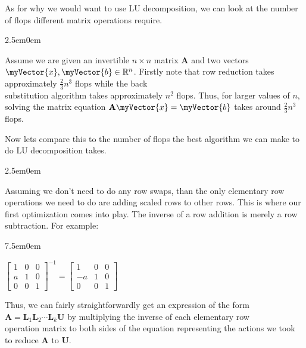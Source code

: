 \documentclass{book}
\newcommand{\hTwo}{%
   \color{MidnightBlue}%
   \fontsize{13}{15}\selectfont%
}
\newcommand{\hThree}{%
   \color{PineGreen}
   \fontsize{13}{15}\selectfont%
}
\newenvironment{myIndent}{%
   \begin{adjustwidth}{2.5em}{0em}%
}{%
   \end{adjustwidth}%
}
\newenvironment{myTindent}{%
   \begin{adjustwidth}{7.5em}{0em}%
}{%
   \end{adjustwidth}%
}
\newcommand{\retTwo}{\hfill\bigbreak}
\newcommand{\mVec}[1]{\myVector{#1}}
\newcommand{\mMat}[1]{\mathbf{#1}}
\begin{document}
   As for why we would want to use LU decomposition, we can look at the number of flops different matrix operations require.
   \hTwo
   \begin{myIndent}
      Assume we are given an invertible $n\times n$ matrix $\mMat{A}$ and two vectors $\mVec{x}, \mVec{b} \in \mathbb{R}^n$. \retTwo
      Firstly note that row reduction takes approximately $\frac{2}{3}n^3$ flops while the back\\ substitution algorithm takes approximately $n^2$ flops. Thus, for larger values of $n$, solving the matrix equation $\mMat{A}\mVec{x} = \mVec{b}$ takes around $\frac{2}{3}n^3$ flops. \retTwo

      Now lets compare this to the number of flops the best algorithm we can make to do LU decomposition takes.
      
      {\begin{myIndent} \hThree
         Assuming we don't need to do any row swaps, than the only elementary row operations we need to do are adding scaled rows to other rows. This is where our first optimization comes into play. The inverse of a row addition is merely a row subtraction. For example:
            {\begin{myTindent} \hThree
               $\begin{bmatrix}
                  1 & 0 & 0 \\
                  a & 1 & 0 \\
                  0 & 0 & 1
               \end{bmatrix}^{-1} = \begin{bmatrix}
                  1 & 0 & 0 \\
                  -a & 1 & 0 \\
                  0 & 0 & 1
               \end{bmatrix}$ \retTwo
            \end{myTindent}}

         \newpage
         Thus, we can fairly straightforwardly get an expression of the form \\$ \mMat{A} = \mMat{L}_1 \mMat{L}_2 \cdots \mMat{L}_k \mMat{U}$ by multiplying the inverse of each elementary row \\operation matrix to both sides of the equation representing the actions we took to reduce $\mMat{A}$ to $\mMat{U}$. \retTwo


\end{myIndent}}
\end{myIndent}
\end{document}
